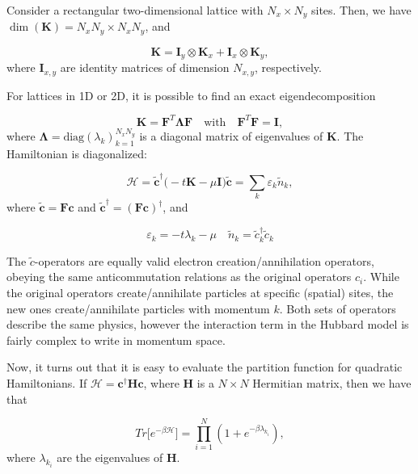 \documentclass[10pt, twocolumn, twoside]{article}
\begin{document}
Consider a rectangular two-dimensional lattice with $N_x \times N_y$ sites. Then, we have $\dim(\bm K) = N_x N_y \times N_x N_y $, and

\begin{equation}
\bm K = \bm I_y \otimes \bm K_x + \bm I_x \otimes \bm K_y ,
\end{equation}
where $\bm I_{x, y}$ are identity matrices of dimension $N_{x, y}$, respectively.

For lattices in 1D or 2D, it is possible to find an exact eigendecomposition

\begin{equation}
\bm K = \bm F^T \bm \Lambda \bm F \quad \text{with}  \quad \bm F^T \bm F = \bm I ,
\end{equation}
where $\bm \Lambda = \text{diag}(\lambda_k)_{k = 1}^{N_x N_y}$ is a diagonal matrix of eigenvalues of $\bm K$. The Hamiltonian is diagonalized:

\begin{equation}\label{eq:quadraticH}
\mathcal{H} =\tilde{\bm c}^\dagger \big( -t \bm K - \mu \bm I \big) \tilde{\bm c} = \sum_k \varepsilon_k \tilde{n}_k ,
\end{equation}
where $\tilde{\bm c} = \bm F \bm c$ and $\tilde{\bm c}^\dagger = (\bm F \bm c)^\dagger$, and

\begin{equation}
\varepsilon_k = -t \lambda_k - \mu \quad \tilde{n}_k = \tilde{c}_k^\dagger \tilde{c}_k
\end{equation}

The $\tilde{c}$-operators are equally valid electron creation/annihilation operators, obeying the same anticommutation relations as the original operators $c_i$. While the original operators create/annihilate particles at specific (spatial) sites, the new ones create/annihilate particles with momentum $k$. Both sets of operators describe the same physics, however the interaction term in the Hubbard model is fairly complex to write in momentum space.

\bigskip

Now, it turns out that it is easy to evaluate the partition function for quadratic Hamiltonians. If $\mathcal{H} = \bm c^\dagger \bm H \bm c$, where $\bm H$ is a $N \times N$ Hermitian matrix, then we have that

\begin{equation}\label{eq:trace_quadratic}
Tr \big[ e^{-\beta \mathcal{H} } \big] = \prod_{i=1}^N ( 1 + e^{-\beta \lambda_{k_i} } ) ,
\end{equation}
where $\lambda_{k_i}$ are the eigenvalues of $\bm H$.
\end{document}
